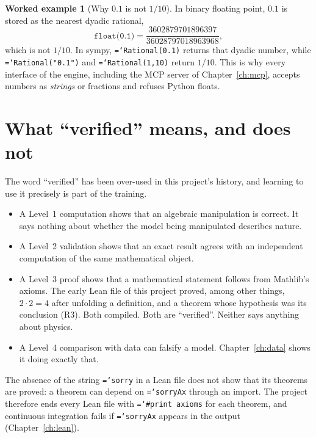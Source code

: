 \documentclass[11pt,a4paper,openany]{book}
\newcommand{\code}[1]{\texttt{\hyphenchar\font=`\-\relax #1}}
\theoremstyle{definition}
\newtheorem{example}{Worked example}[chapter]
\theoremstyle{plain}
\begin{document}
\begin{example}[Why $0.1$ is not $1/10$]
In binary floating point, $0.1$ is stored as the nearest dyadic rational,
\[
  \texttt{float(0.1)} = \frac{3602879701896397}{36028797018963968},
\]
which is not $1/10$. In sympy, \code{Rational(0.1)} returns that dyadic number, while
\code{Rational("0.1")} and \code{Rational(1,10)} return $1/10$. This is why every interface of
the engine, including the MCP server of Chapter~\ref{ch:mcp}, accepts numbers as \emph{strings}
or fractions and refuses Python floats.
\end{example}

\section{What ``verified'' means, and does not}

The word ``verified'' has been over-used in this project's history, and learning to use it
precisely is part of the training.
\begin{itemize}
  \item A Level~1 computation shows that an algebraic manipulation is correct. It says nothing about
        whether the model being manipulated describes nature.
  \item A Level~2 validation shows that an exact result agrees with an independent computation of
        the same mathematical object.
  \item A Level~3 proof shows that a mathematical statement follows from Mathlib's axioms. The
        early Lean file of this project proved, among other things, $2\cdot2=4$ after unfolding a
        definition, and a theorem whose hypothesis was its conclusion (R3). Both compiled. Both
        are ``verified''. Neither says anything about physics.
  \item A Level~4 comparison with data can falsify a model. Chapter~\ref{ch:data} shows it doing
        exactly that.
\end{itemize}

\begin{lesson}
The absence of the string \code{sorry} in a Lean file does not show that its theorems are
proved: a theorem can depend on \code{sorryAx} through an import. The project therefore ends every
Lean file with \code{\#print axioms} for each theorem, and continuous integration fails if
\code{sorryAx} appears in the output (Chapter~\ref{ch:lean}).
\end{lesson}
\end{document}

